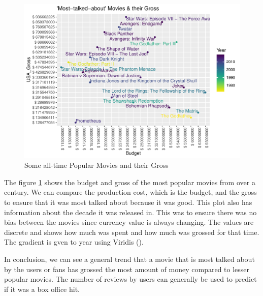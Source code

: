 \documentclass[11pt,a4paper,]{article}
\begin{document}
\begin{figure}[H]

{\centering \includegraphics{Report_files/figure-latex/AllGrossPlot-1} 

}

\caption{Some all-time Popular Movies and their Gross}\label{fig:AllGrossPlot}
\end{figure}

The figure \ref{fig:AllGrossPlot} shows the budget and gross of the most popular movies from over a century. We can compare the production cost, which is the budget, and the gross to ensure that it was most talked about because it was good. This plot also has information about the decade it was released in. This was to ensure there was no bias between the movies since currency value is always changing. The values are discrete and shows how much was spent and how much was grossed for that time. The gradient is gven to year using Viridis (\textcite{viridis}).

In conclusion, we can see a general trend that a movie that is most talked about by the users or fans has grossed the most amount of money compared to lesser popular movies. The number of reviews by users can generally be used to predict if it was a box office hit.

\printbibliography
\end{document}
